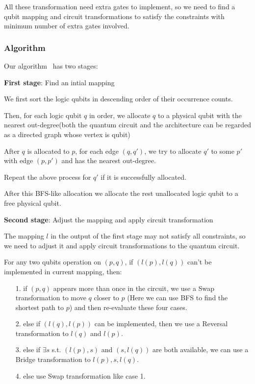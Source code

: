 All these transformation need extra gates to implement, so we need to find a qubit mapping and circuit transformations to satisfy the constraints with minimum number of extra gates involved.

\subsubsection{Algorithm}

Our algorithm~\cite{qa} has two stages:

\textbf{First stage}: Find an intial mapping

We first sort the logic qubits in descending order of their occurrence counts.

Then, for each logic qubit $q$ in order, we allocate $q$ to a physical qubit with the nearest out-degree(both the quantum circuit and the architecture can be regarded as a directed graph whose vertex is qubit)

After $q$ is allocated to $p$, for each edge $(q,q')$, we try to allocate $q'$ to some $p'$ with edge $(p,p')$ and has the nearest out-degree.

Repeat the above process for $q'$ if it is successfully allocated.

After this BFS-like allocation we allocate the rest unallocated logic qubit to a free physical qubit.

\textbf{Second stage}: Adjust the mapping and apply circuit transformation

The mapping $l$ in the output of the first stage may not satisfy all constraints, so we need to adjust it and apply circuit transformations to the quantum circuit.

For any two qubits operation on $(p,q)$, if $(l(p),l(q))$ can't be implemented in current mapping, then:
\begin{itemize}
    \item[1.] if $(p,q)$ appears more than once in the circuit, we use a Swap transformation to move $q$ closer to $p$ (Here we can use BFS to find the shortest path to $p$) and then re-evaluate these four cases.
    \item[2.] else if $(l(q), l(p))$ can be implemented, then we use a Reversal transformation to $l(q)$ and $l(p)$.
    \item[3.] else if $\exists s$ s.t. $(l(p),s)$ and $(s, l(q))$ are both available, we can use a Bridge transformation to $l(p), s, l(q)$.
    \item[4.] else use Swap transformation like case 1.
\end{itemize}
